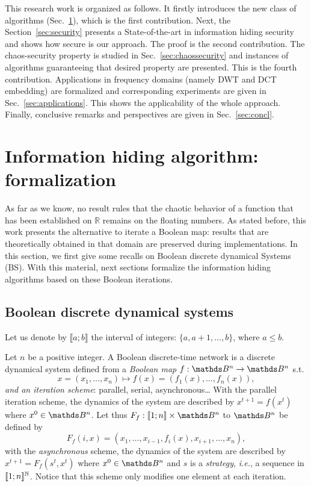 \documentclass{comjnl}
\begin{document}
This research work is organized as follows.
It firstly introduces the new class of algorithms (Sec.~\ref{sec:formalization}), which is the first contribution.
Next, the Section~\ref{sec:security} presents a 
State-of-the-art  in information hiding security and shows how secure  
is our approach. The proof is the second contribution.
The chaos-security property is studied in Sec.~\ref{sec:chaossecurity}
and instances of algorithms guaranteeing that desired property are presented.
This is the fourth contribution. 
Applications in frequency domains (namely DWT and DCT embedding) 
are formalized and corresponding experiments are 
given in Sec.~\ref{sec:applications}. 
This shows the applicability of the whole approach.
Finally, conclusive remarks and perspectives are given in Sec.~\ref{sec:concl}.


\section{Information hiding algorithm: formalization}
\label{sec:formalization}

As far as we know, no result rules that the chaotic behavior of a function 
that has been established on $\mathbb{R}$ remains on the floating numbers.
As stated before, this work presents the alternative to iterate a Boolean map:
results that are theoretically obtained in that domain are preserved  
during implementations.
In this section, we first give some recalls on Boolean discrete
dynamical Systems (BS). With this material, next sections formalize the information hiding algorithms based on 
these Boolean iterations.




\subsection{Boolean discrete dynamical systems}\label{sub:bdds}



Let us denote by $\llbracket a ; b \rrbracket$ the interval of integers:
$\{a, a+1, \hdots, b\}$, where $a \leqslant b$. 


Let $n$ be a positive integer. A Boolean discrete-time 
network is a discrete dynamical
system defined from a {\emph{Boolean map}}
$f:\Bool^n\to\Bool^n$ s.t. 
\[
  x=(x_1,\dots,x_n)\mapsto f(x)=(f_1(x),\dots,f_n(x)),
\]
{\emph{and an iteration scheme}}: parallel, serial,
asynchronous\ldots 
With the parallel iteration scheme, 
the dynamics of the system are described by $x^{t+1}=f(x^t)$
where $x^0 \in \Bool^n$.
Let thus $F_f: \llbracket1;n\rrbracket\times \Bool^{n}$ to $\Bool^n$ 
be defined by
\[
F_f(i,x)=(x_1,\dots,x_{i-1},f_i(x),x_{i+1},\dots,x_n),
\]
with the \emph{asynchronous} scheme,
the dynamics of the system are described by $x^{t+1}=F_f(s^t,x^t)$
where $x^0\in\Bool^n$ and $s$ is a {\emph{strategy}}, \textit{i.e.}, a sequence 
in $\llbracket1;n\rrbracket^{\mathbb{N}}$.
Notice that this scheme only modifies one element at each iteration.
\end{document}
